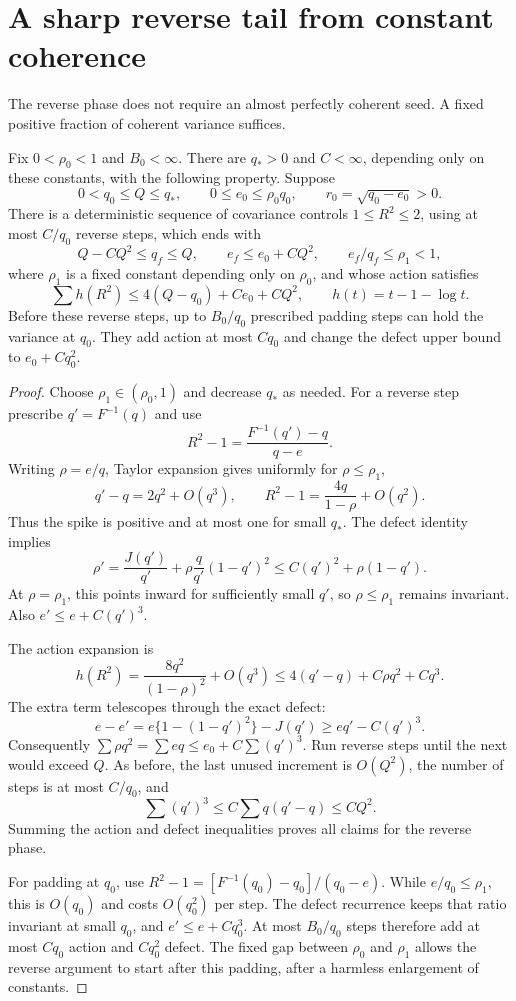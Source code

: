\section{A sharp reverse tail from constant coherence}
\label{sec:covariance-spike-tail}
The reverse phase does not require an almost perfectly coherent seed. A fixed positive fraction of coherent variance suffices.

\begin{lemma}
\label{lem:spike-reverse-tail}
Fix $0<\rho_0<1$ and $B_0<\infty$. There are $q_*>0$ and $C<\infty$, depending only on these constants, with the following property. Suppose
\[
 0<q_0\le Q\le q_*,\qquad
 0\le e_0\le\rho_0q_0,\qquad r_0=\sqrt{q_0-e_0}>0.
\]
There is a deterministic sequence of covariance controls $1\le R^2\le2$, using at most $C/q_0$ reverse steps, which ends with
\[
 Q-CQ^2\le q_f\le Q,\qquad
 e_f\le e_0+CQ^2,\qquad e_f/q_f\le\rho_1<1,
\]
where $\rho_1$ is a fixed constant depending only on $\rho_0$, and whose action satisfies
\[
 \sum h(R^2)\le4(Q-q_0)+Ce_0+CQ^2,
 \qquad h(t)=t-1-\log t.
\]
Before these reverse steps, up to $B_0/q_0$ prescribed padding steps can hold the variance at $q_0$. They add action at most $Cq_0$ and change the defect upper bound to $e_0+Cq_0^2$.
\end{lemma}
\begin{proof}
Choose $\rho_1\in(\rho_0,1)$ and decrease $q_*$ as needed. For a reverse step prescribe $q'=F^{-1}(q)$ and use
\[
 R^2-1=\frac{F^{-1}(q')-q}{q-e}.
\]
Writing $\rho=e/q$, Taylor expansion gives uniformly for $\rho\le\rho_1$,
\[
 q'-q=2q^2+O(q^3),\qquad
 R^2-1=\frac{4q}{1-\rho}+O(q^2).
\]
Thus the spike is positive and at most one for small $q_*$. The defect identity implies
\[
 \rho'=\frac{J(q')}{q'}+\rho\frac q{q'}(1-q')^2
 \le C(q')^2+\rho(1-q').
\]
At $\rho=\rho_1$, this points inward for sufficiently small $q'$, so $\rho\le\rho_1$ remains invariant. Also $e'\le e+C(q')^3$.

The action expansion is
\[
 h(R^2)=\frac{8q^2}{(1-\rho)^2}+O(q^3)
 \le4(q'-q)+C\rho q^2+Cq^3.
\]
The extra term telescopes through the exact defect:
\[
 e-e'=e\{1-(1-q')^2\}-J(q')
       \ge e q'-C(q')^3.
\]
Consequently $\sum\rho q^2=\sum e q\le e_0+C\sum(q')^3$.
Run reverse steps until the next would exceed $Q$. As before, the last unused increment is $O(Q^2)$, the number of steps is at most $C/q_0$, and
\[
 \sum(q')^3\le C\sum q(q'-q)\le CQ^2.
\]
Summing the action and defect inequalities proves all claims for the reverse phase.

For padding at $q_0$, use
$R^2-1=[F^{-1}(q_0)-q_0]/(q_0-e)$. While $e/q_0\le\rho_1$, this is $O(q_0)$ and costs $O(q_0^2)$ per step. The defect recurrence keeps that ratio invariant at small $q_0$, and $e'\le e+Cq_0^3$. At most $B_0/q_0$ steps therefore add at most $Cq_0$ action and $Cq_0^2$ defect. The fixed gap between $\rho_0$ and $\rho_1$ allows the reverse argument to start after this padding, after a harmless enlargement of constants.
\end{proof}

